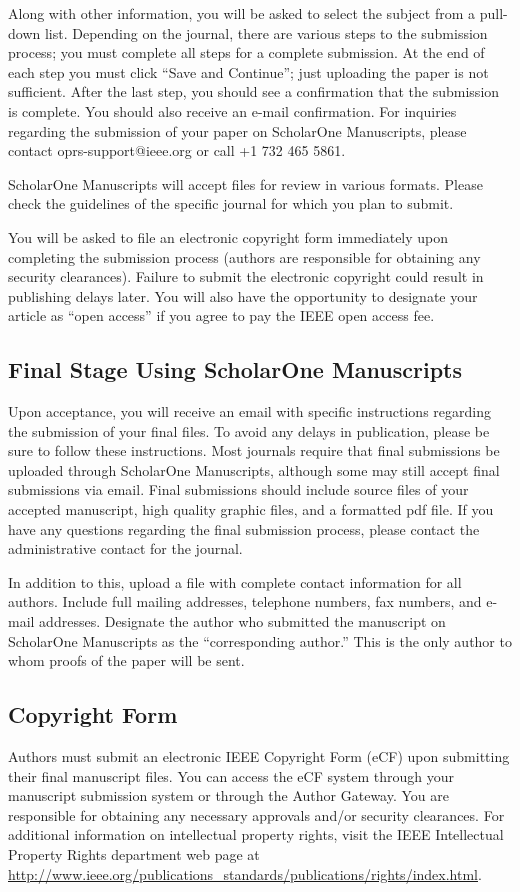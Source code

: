 \documentclass{ieeeaccess}
\begin{document}
Along with other information, you will be asked to select the subject from a
pull-down list. Depending on the journal, there are various steps to the
submission process; you must complete all steps for a complete submission.
At the end of each step you must click ``Save and Continue''; just uploading
the paper is not sufficient. After the last step, you should see a
confirmation that the submission is complete. You should also receive an
e-mail confirmation. For inquiries regarding the submission of your paper on
ScholarOne Manuscripts, please contact oprs-support@ieee.org or call +1 732
465 5861.

ScholarOne Manuscripts will accept files for review in various formats.
Please check the guidelines of the specific journal for which you plan to
submit.

You will be asked to file an electronic copyright form immediately upon
completing the submission process (authors are responsible for obtaining any
security clearances). Failure to submit the electronic copyright could
result in publishing delays later. You will also have the opportunity to
designate your article as ``open access'' if you agree to pay the IEEE open
access fee.

\subsection{Final Stage Using ScholarOne Manuscripts}
Upon acceptance, you will receive an email with specific instructions
regarding the submission of your final files. To avoid any delays in
publication, please be sure to follow these instructions. Most journals
require that final submissions be uploaded through ScholarOne Manuscripts,
although some may still accept final submissions via email. Final
submissions should include source files of your accepted manuscript, high
quality graphic files, and a formatted pdf file. If you have any questions
regarding the final submission process, please contact the administrative
contact for the journal.

In addition to this, upload a file with complete contact information for all
authors. Include full mailing addresses, telephone numbers, fax numbers, and
e-mail addresses. Designate the author who submitted the manuscript on
ScholarOne Manuscripts as the ``corresponding author.'' This is the only
author to whom proofs of the paper will be sent.

\subsection{Copyright Form}
Authors must submit an electronic IEEE Copyright Form (eCF) upon submitting
their final manuscript files. You can access the eCF system through your
manuscript submission system or through the Author Gateway. You are
responsible for obtaining any necessary approvals and/or security
clearances. For additional information on intellectual property rights,
visit the IEEE Intellectual Property Rights department web page at
\underline{http://www.ieee.org/publications\_standards/publications/}\break\underline{rights/index.html}.
\end{document}
